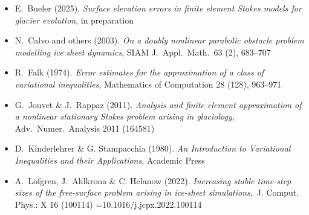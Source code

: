 
\begin{itemize}
\item E.~Bueler (2025). \emph{Surface elevation errors in finite element {S}tokes models for glacier evolution}, in preparation 
\item N.~Calvo and others (2003). \emph{On a doubly nonlinear parabolic obstacle problem modelling ice sheet dynamics}, SIAM J.~Appl.~Math.~63 (2), 683--707 
\item R.~Falk (1974).  \emph{Error estimates for the approximation of a class of variational inequalities}, Mathematics of Computation 28 (128), 963--971
\item G.~Jouvet \& J.~Rappaz (2011). \emph{Analysis and finite element approximation of a nonlinear stationary {S}tokes problem arising in glaciology}, Adv.~Numer.~Analysis 2011 (164581) 
\item D.~Kinderlehrer \& G. Stampacchia (1980). \emph{An {I}ntroduction to {V}ariational {I}nequalities and their {A}pplications}, Academic Press
\item A.~L{\"o}fgren, J.~Ahlkrona \& C. Helanow (2022). \emph{Increasing stable time-step sizes of the free-surface problem arising in ice-sheet simulations},~J. Comput. Phys.: X 16 (100114) \sdoi={10.1016/j.jcpx.2022.100114}
\end{itemize}
